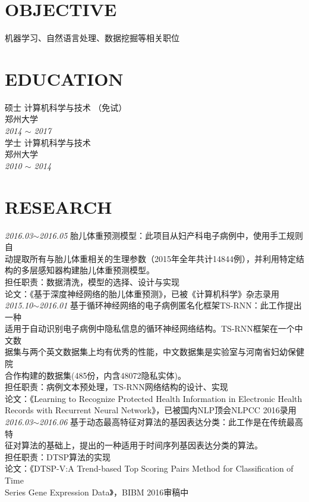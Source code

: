 \documentclass[line, margin]{res}
\newcommand{\xiaowu}{\fontsize{9pt}{15.75pt}\selectfont} %
\begin{document}
\address{likun@stu.zzu.edu.cn}
\address{152-2511-1797}

\begin{resume}
\vspace {5pt}
\section{OBJECTIVE}
 { 机器学习、自然语言处理、数据挖掘等相关职位}

\section{EDUCATION} 
 { 硕士 计算机科学与技术 （免试）  \\
 郑州大学 }\\
 {\sl 2014 $\sim$ 2017} \\
[15pt]
 { 学士 计算机科学与技术 \\
 郑州大学 } \\
 {\sl 2010 $\sim$ 2014 }

\section{RESEARCH}
 {
 {\sl 2016.03$\sim$2016.05} 胎儿体重预测模型：{ 此项目从妇产科电子病例中，使用手工规则自\\
 动提取所有与胎儿体重相关的生理参数（2015年全年共计14844例），并利用特定结\\
 构的多层感知器构建胎儿体重预测模型。} \\
 {\xiaowu 担任职责：数据清洗，模型的选择、设计与实现}\\
 {\xiaowu 论文：《基于深度神经网络的胎儿体重预测》，已被《计算机科学》杂志录用} \\
[9pt]
 {\sl 2015.10$\sim$2016.01} 基于循环神经网络的电子病例匿名化框架TS-RNN：{ 此工作提出一种\\
 适用于自动识别电子病例中隐私信息的循环神经网络结构。TS-RNN框架在一个中文数\\
 据集与两个英文数据集上均有优秀的性能，中文数据集是实验室与河南省妇幼保健院\\
 合作构建的数据集(485份，内含48072隐私实体)。} \\
 {\xiaowu 担任职责：病例文本预处理，TS-RNN网络结构的设计、实现}\\
 {\xiaowu 论文：《Learning to Recognize Protected Health Information in  Electronic Health\\
 Records with Recurrent Neural Network》，已被国内NLP顶会NLPCC 2016录用}\\
[9pt]
 {\sl 2016.03$\sim$2016.06} 基于动态最高特征对算法的基因表达分类：{ 此工作是在传统最高特\\
 征对算法的基础上，提出的一种适用于时间序列基因表达分类的算法。}\\
 {\xiaowu 担任职责：DTSP算法的实现}\\
 {\xiaowu 论文：《DTSP-V:A Trend-based Top Scoring Pairs Method for Classification of Time\\
  Series Gene Expression Data》，BIBM 2016审稿中} }


\end{resume}
\end{document}
